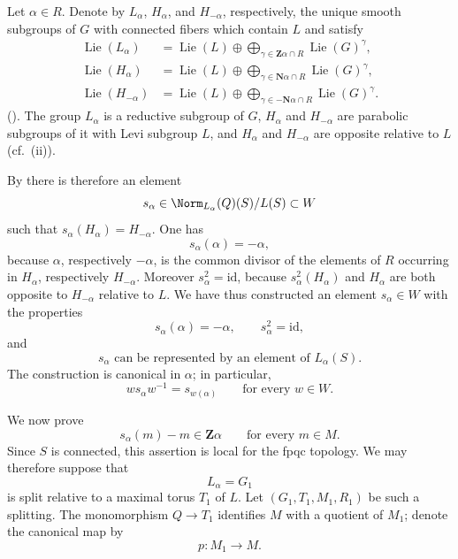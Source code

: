 Let \(\alpha\in R\).  Denote by \(L_\alpha\), \(H_\alpha\), and
\(H_{-\alpha}\), respectively, the unique smooth subgroups of \(G\)
with connected fibers which contain \(L\) and satisfy
\[
\begin{aligned}
 \operatorname{Lie}(L_\alpha)
  &=\operatorname{Lie}(L)
    \oplus\bigoplus_{\gamma\in\mathbf Z\alpha\cap R}
       \operatorname{Lie}(G)^\gamma,\\
 \operatorname{Lie}(H_\alpha)
  &=\operatorname{Lie}(L)
    \oplus\bigoplus_{\gamma\in\mathbf N\alpha\cap R}
       \operatorname{Lie}(G)^\gamma,\\
 \operatorname{Lie}(H_{-\alpha})
  &=\operatorname{Lie}(L)
    \oplus\bigoplus_{\gamma\in-\mathbf N\alpha\cap R}
       \operatorname{Lie}(G)^\gamma.
\end{aligned}
\]
\textup{()}.  The group \(L_\alpha\) is a reductive subgroup of \(G\),
\(H_\alpha\) and \(H_{-\alpha}\) are parabolic subgroups of it with
Levi subgroup \(L\), and \(H_\alpha\) and \(H_{-\alpha}\) are opposite
relative to \(L\) \textup{(cf.\ \textup{(ii)})}.

By  there is therefore an element
\[
 s_\alpha\in\Norm_{L_\alpha}(Q)(S)/L(S)\subset W
\]
such that \(s_\alpha(H_\alpha)=H_{-\alpha}\).  One has
\[
 s_\alpha(\alpha)=-\alpha,
\]
because \(\alpha\), respectively \(-\alpha\), is the common divisor
of the elements of \(R\) occurring in \(H_\alpha\), respectively
\(H_{-\alpha}\).  Moreover \(s_\alpha^2=\mathrm{id}\), because
\(s_\alpha^2(H_\alpha)\) and \(H_\alpha\) are both opposite to
\(H_{-\alpha}\) relative to \(L\).  We have thus constructed an
element \(s_\alpha\in W\) with the properties
\[
\tag{x}\label{sga3:xxvi:subsection:7-4-2:equation:x}
 s_\alpha(\alpha)=-\alpha,\qquad s_\alpha^2=\mathrm{id},
\]
and
\[
\tag{xx}\label{sga3:xxvi:subsection:7-4-2:equation:xx}
 s_\alpha\text{ can be represented by an element of }L_\alpha(S).
\]
The construction is canonical in \(\alpha\); in particular,
\[
\tag{xxx}\label{sga3:xxvi:subsection:7-4-2:equation:xxx}
 w s_\alpha w^{-1}=s_{w(\alpha)}
 \qquad\text{for every }w\in W.
\]


We now prove
\[
\tag{xxxx}\label{sga3:xxvi:subsection:7-4-3:equation:xxxx}
 s_\alpha(m)-m\in\mathbf Z\alpha
 \qquad\text{for every }m\in M.
\]
Since \(S\) is connected, this assertion is local for the fpqc
topology.  We may therefore suppose that
\[
 L_\alpha=G_1
\]
is split relative to a maximal torus \(T_1\) of \(L\).  Let
\((G_1,T_1,M_1,R_1)\) be such a splitting.  The monomorphism
\(Q\to T_1\) identifies \(M\) with a quotient of \(M_1\); denote the
canonical map by
\[
 p:M_1\longrightarrow M.
\]

